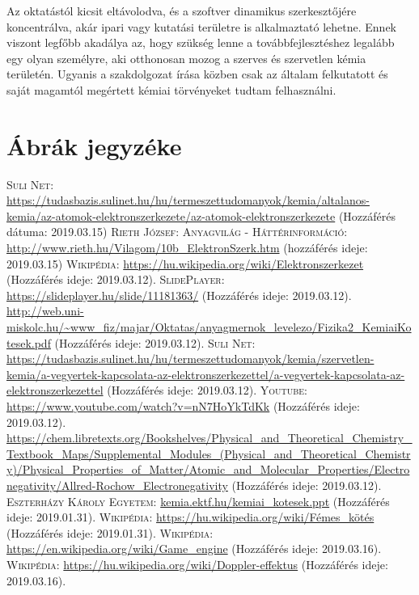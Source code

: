 \documentclass[colorlinks]{thesis-ekf}
\theoremstyle{definition}
\theoremstyle{remark}
\begin{document}
Az oktatástól kicsit eltávolodva, és a szoftver dinamikus szerkesztőjére koncentrálva, akár ipari vagy kutatási területre is alkalmaztató lehetne. Ennek viszont legfőbb akadálya az, hogy szükség lenne a továbbfejlesztéshez legalább egy olyan személyre, aki otthonosan mozog a szerves és szervetlen kémia területén. Ugyanis a szakdolgozat írása közben csak az általam felkutatott és saját magamtól megértett kémiai törvényeket tudtam felhasználni.
\chapter{Ábrák jegyzéke}
\begin{thebibliography}{1}
	 \textsc{Suli Net}: \url{https://tudasbazis.sulinet.hu/hu/termeszettudomanyok/kemia/altalanos-kemia/az-atomok-elektronszerkezete/az-atomok-elektronszerkezete} (Hozzáférés dátuma: 2019.03.15)
	  \textsc{Rieth József: Anyagvilág - Háttérinformáció}: \url{http://www.rieth.hu/Vilagom/10b_ElektronSzerk.htm} (hozzáférés ideje: 2019.03.15)
	 \textsc{Wikipédia}: \url{https://hu.wikipedia.org/wiki/Elektronszerkezet} (Hozzáférés ideje: 2019.03.12).
	 \textsc{SlidePlayer}: \url{https://slideplayer.hu/slide/11181363/} (Hozzáférés ideje: 2019.03.12).
	 \url{http://web.uni-miskolc.hu/~www_fiz/majar/Oktatas/anyagmernok_levelezo/Fizika2_KemiaiKotesek.pdf} (Hozzáférés ideje: 2019.03.12).
	 \textsc{Suli Net}: \url{https://tudasbazis.sulinet.hu/hu/termeszettudomanyok/kemia/szervetlen-kemia/a-vegyertek-kapcsolata-az-elektronszerkezettel/a-vegyertek-kapcsolata-az-elektronszerkezettel} (Hozzáférés ideje: 2019.03.12).
	 \textsc{Youtube}: \url{https://www.youtube.com/watch?v=nN7HoYkTdKk} (Hozzáférés ideje: 2019.03.12).
	 \url{https://chem.libretexts.org/Bookshelves/Physical_and_Theoretical_Chemistry_Textbook_Maps/Supplemental_Modules_(Physical_and_Theoretical_Chemistry)/Physical_Properties_of_Matter/Atomic_and_Molecular_Properties/Electronegativity/Allred-Rochow_Electronegativity} (Hozzáférés ideje: 2019.03.12).
	 \textsc{Eszterházy Károly Egyetem}: \url{kemia.ektf.hu/kemiai_kotesek.ppt} (Hozzáférés ideje: 2019.01.31).
	 \textsc{Wikipédia}: \url{https://hu.wikipedia.org/wiki/Fémes_kötés} (Hozzáférés ideje: 2019.01.31).
	 \textsc{Wikipédia}: \url{https://en.wikipedia.org/wiki/Game_engine} (Hozzáférés ideje: 2019.03.16).
	 \textsc{Wikipédia}: \url{https://hu.wikipedia.org/wiki/Doppler-effektus} (Hozzáférés ideje: 2019.03.16).

\end{thebibliography}
\end{document}
